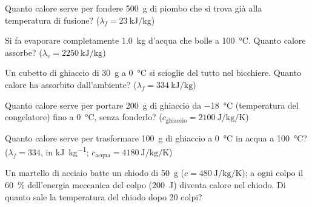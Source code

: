 \begin{esercizio}
Quanto calore serve per fondere \SI{500}{\gram} di piombo che si trova già alla temperatura di fusione? ($\lambda_f = \SI{23}{\kilo\joule\per\kilogram}$)\\
\end{esercizio}

\begin{esercizio}
Si fa evaporare completamente \SI{1,0}{\kilogram} d'acqua che bolle a \SI{100}{\celsius}. Quanto calore assorbe? ($\lambda_v = \SI{2250}{\kilo\joule\per\kilogram}$)\\
\end{esercizio}

\begin{esercizio}
Un cubetto di ghiaccio di \SI{30}{\gram} a \SI{0}{\celsius} si scioglie del tutto nel bicchiere. Quanto calore ha assorbito dall'ambiente? ($\lambda_f = \SI{334}{\kilo\joule\per\kilogram}$)\\
\end{esercizio}

\begin{esercizio}
Quanto calore serve per portare \SI{200}{\gram} di ghiaccio da \SI{-18}{\celsius} (temperatura del congelatore) fino a \SI{0}{\celsius}, senza fonderlo? ($c_{\text{ghiaccio}} = \SI{2100}{\joule\per\kilogram\per\kelvin}$)\\
\end{esercizio}

\begin{esercizio}
Quanto calore serve per trasformare \SI{100}{\gram} di ghiaccio a \SI{0}{\celsius} in acqua a \SI{100}{\celsius}? ($\lambda_f = 334$, in \si{\kilo\joule\per\kilogram}; $c_{\text{acqua}} = \SI{4180}{\joule\per\kilogram\per\kelvin}$)\\
\end{esercizio}

\begin{esercizio}
Un martello di acciaio batte un chiodo di \SI{50}{\gram} ($c = \SI{480}{\joule\per\kilogram\per\kelvin}$); a ogni colpo il \SI{60}{\percent} dell'energia meccanica del colpo (\SI{200}{\joule}) diventa calore nel chiodo. Di quanto sale la temperatura del chiodo dopo \num{20} colpi?\\
\end{esercizio}

